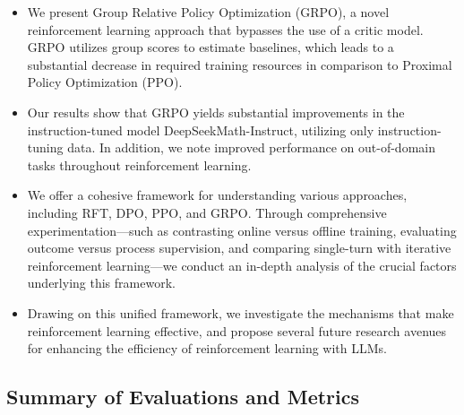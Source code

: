 \begin{itemize}[topsep=0pt]
    \item We present Group Relative Policy Optimization (GRPO), a novel reinforcement learning approach that bypasses the use of a critic model. GRPO utilizes group scores to estimate baselines, which leads to a substantial decrease in required training resources in comparison to Proximal Policy Optimization (PPO).
    \item Our results show that GRPO yields substantial improvements in the instruction-tuned model DeepSeekMath-Instruct, utilizing only instruction-tuning data. In addition, we note improved performance on out-of-domain tasks throughout reinforcement learning.
    \item We offer a cohesive framework for understanding various approaches, including RFT, DPO, PPO, and GRPO. Through comprehensive experimentation—such as contrasting online versus offline training, evaluating outcome versus process supervision, and comparing single-turn with iterative reinforcement learning—we conduct an in-depth analysis of the crucial factors underlying this framework.
    \item Drawing on this unified framework, we investigate the mechanisms that make reinforcement learning effective, and propose several future research avenues for enhancing the efficiency of reinforcement learning with LLMs.
\end{itemize}

\subsection{Summary of Evaluations and Metrics}

